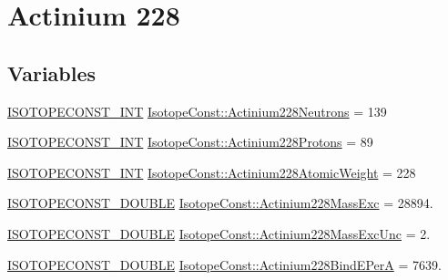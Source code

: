 \hypertarget{group___isotope_const-_actinium-_ac228}{}\section{Actinium 228}
\label{group___isotope_const-_actinium-_ac228}
\subsection*{Variables}
\begin{DoxyCompactItemize}
\item 
\mbox{\hyperlink{group___isotope_const-_macros_ga5f18360b3e99483a35c32d789e62621c}{I\+S\+O\+T\+O\+P\+E\+C\+O\+N\+S\+T\+\_\+\+I\+NT}} \mbox{\hyperlink{group___isotope_const-_actinium-_ac228_gaaf30f63a1b50d49738374f0e240a46fa}{Isotope\+Const\+::\+Actinium228\+Neutrons}} = 139
\item 
\mbox{\hyperlink{group___isotope_const-_macros_ga5f18360b3e99483a35c32d789e62621c}{I\+S\+O\+T\+O\+P\+E\+C\+O\+N\+S\+T\+\_\+\+I\+NT}} \mbox{\hyperlink{group___isotope_const-_actinium-_ac228_ga66de5f9ab4d0022dac1816dbef77700d}{Isotope\+Const\+::\+Actinium228\+Protons}} = 89
\item 
\mbox{\hyperlink{group___isotope_const-_macros_ga5f18360b3e99483a35c32d789e62621c}{I\+S\+O\+T\+O\+P\+E\+C\+O\+N\+S\+T\+\_\+\+I\+NT}} \mbox{\hyperlink{group___isotope_const-_actinium-_ac228_gafb55e0f2769678dc06f6cce9fcfa4c7c}{Isotope\+Const\+::\+Actinium228\+Atomic\+Weight}} = 228
\item 
\mbox{\hyperlink{group___isotope_const-_macros_ga8f45a7272ce02c0b4c65c44636ed719a}{I\+S\+O\+T\+O\+P\+E\+C\+O\+N\+S\+T\+\_\+\+D\+O\+U\+B\+LE}} \mbox{\hyperlink{group___isotope_const-_actinium-_ac228_ga855a24fa9382f48dbd93096f1abfa53f}{Isotope\+Const\+::\+Actinium228\+Mass\+Exc}} = 28894.
\item 
\mbox{\hyperlink{group___isotope_const-_macros_ga8f45a7272ce02c0b4c65c44636ed719a}{I\+S\+O\+T\+O\+P\+E\+C\+O\+N\+S\+T\+\_\+\+D\+O\+U\+B\+LE}} \mbox{\hyperlink{group___isotope_const-_actinium-_ac228_ga30dd87d7ff6e8ab5b5d538595e3476ec}{Isotope\+Const\+::\+Actinium228\+Mass\+Exc\+Unc}} = 2.
\item 
\mbox{\hyperlink{group___isotope_const-_macros_ga8f45a7272ce02c0b4c65c44636ed719a}{I\+S\+O\+T\+O\+P\+E\+C\+O\+N\+S\+T\+\_\+\+D\+O\+U\+B\+LE}} \mbox{\hyperlink{group___isotope_const-_actinium-_ac228_ga0b163905ca13899e507c183f6c791d9e}{Isotope\+Const\+::\+Actinium228\+Bind\+E\+PerA}} = 7639.
\item 

\end{DoxyCompactItemize}
